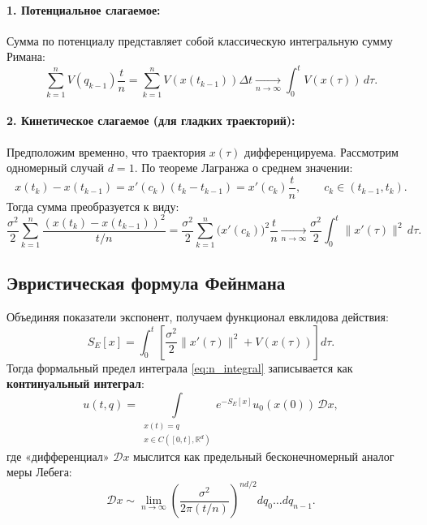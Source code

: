 \documentclass[12pt,a4paper]{article}
\begin{document}
\paragraph{1. Потенциальное слагаемое:}
Сумма по потенциалу представляет собой классическую интегральную сумму Римана:
\begin{equation}
    \sum_{k=1}^n V(q_{k-1}) \frac{t}{n} = \sum_{k=1}^n V(x(t_{k-1})) \Delta t \xrightarrow[n \to \infty]{} \int_0^t V(x(\tau)) \, d\tau.
\end{equation}

\paragraph{2. Кинетическое слагаемое (для гладких траекторий):}
Предположим временно, что траектория $x(\tau)$ дифференцируема. Рассмотрим одномерный случай $d=1$. По теореме Лагранжа о среднем значении:
\begin{equation}
    x(t_k) - x(t_{k-1}) = x'(c_k)(t_k - t_{k-1}) = x'(c_k) \frac{t}{n}, \qquad c_k \in (t_{k-1}, t_k).
\end{equation}
Тогда сумма преобразуется к виду:
\begin{equation}
    \frac{\sigma^2}{2} \sum_{k=1}^n \frac{(x(t_k) - x(t_{k-1}))^2}{t/n} = \frac{\sigma^2}{2} \sum_{k=1}^n \big(x'(c_k)\big)^2 \frac{t}{n} \xrightarrow[n \to \infty]{} \frac{\sigma^2}{2} \int_0^t \|x'(\tau)\|^2 \, d\tau.
\end{equation}

\subsection{Эвристическая формула Фейнмана}
Объединяя показатели экспонент, получаем функционал евклидова действия:
\begin{equation}
    S_E[x] = \int_0^t \left[ \frac{\sigma^2}{2} \|x'(\tau)\|^2 + V(x(\tau)) \right] d\tau.
\end{equation}
Тогда формальный предел интеграла \eqref{eq:n_integral} записывается как \textbf{континуальный интеграл}:
\begin{equation}
    \label{eq:feynman_heuristic}
    u(t, q) = \int\limits_{\substack{x(t)=q \\ x \in C([0, t], \mathbb{R}^d)}} e^{-S_E[x]} u_0(x(0)) \, \mathcal{D}x,
\end{equation}
где «дифференциал» $\mathcal{D}x$ мыслится как предельный бесконечномерный аналог меры Лебега:
\begin{equation}
    \mathcal{D}x \sim \lim_{n \to \infty} \left(\frac{\sigma^2}{2\pi (t/n)}\right)^{\!\!nd/2} dq_0 \dots dq_{n-1}.
\end{equation}
\end{document}
